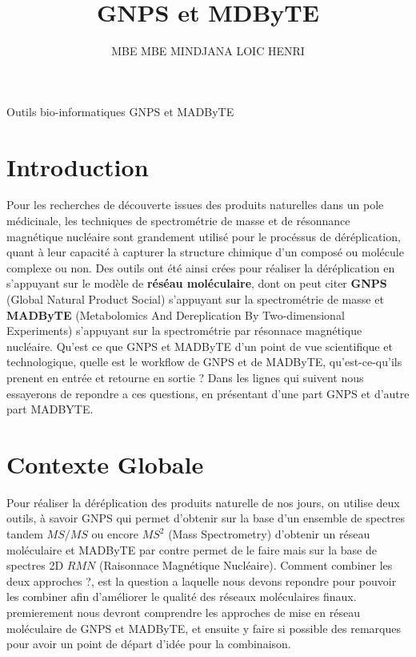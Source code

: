 \documentclass[12pt, french, latin.medieval, a4paper]{report}
\author{MBE MBE MINDJANA LOIC HENRI}
\title{GNPS et MDByTE}
\begin{document}
    
    \pagecouverture
    {Outils bio-informatiques GNPS et MADByTE}
    {}
    
    \tableofcontents
    \vspace{20cm}

    \section{Introduction}
    Pour les recherches de découverte issues des produits naturelles dans un pole médicinale, les techniques de spectrométrie de masse et de résonnance magnétique nucléaire sont grandement utilisé pour le procéssus de déréplication, quant à leur capacité à capturer la structure chimique d'un composé ou molécule complexe ou non. Des outils ont été ainsi crées pour réaliser la déréplication en s'appuyant sur le modèle de \textbf{réséau moléculaire}, dont on peut citer \textbf{GNPS} (Global Natural Product Social) s'appuyant sur la spectrométrie de masse et \textbf{MADByTE} (Metabolomics And Dereplication By Two-dimensional Experiments) s'appuyant sur la spectrométrie par résonnace magnétique nucléaire. Qu'est ce que GNPS et MADByTE d'un point de vue scientifique et technologique, quelle est le workflow de GNPS et de MADByTE, qu'est-ce-qu'ils prenent en entrée et retourne en sortie ? Dans les lignes qui suivent nous essayerons de repondre a ces questions, en présentant d'une part GNPS et d'autre part MADBYTE. 


    \section{Contexte Globale}
    Pour réaliser la déréplication des produits naturelle de nos jours, on utilise deux outils, à savoir GNPS qui permet d'obtenir sur la base d'un ensemble de spectres tandem $MS/MS$ ou encore $MS^{2}$  (Mass Spectrometry) d'obtenir un réseau moléculaire et MADByTE par contre permet de le faire mais sur la base de spectres 2D $RMN$ (Raisonnace Magnétique Nucléaire). Comment combiner les deux approches ?, est la question a laquelle nous devons repondre pour pouvoir les combiner afin d'améliorer le qualité des réseaux moléculaires finaux. premierement nous devront comprendre les approches de mise en réseau moléculaire de GNPS et MADByTE, et ensuite y faire si possible des remarques pour avoir un point de départ d'idée pour la combinaison.

    
\end{document}
